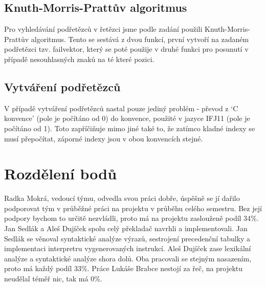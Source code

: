 \documentclass[a4paper,11pt,titlepage]{article}
\begin{document}
\subsection{Knuth-Morris-Prattův algoritmus}

Pro vyhledávání podřetězců v řetězci jsme podle zadání použili Knuth-Morris-Prattův algoritmus. Tento se sestává z dvou funkcí, první vytvoří na zadaném podřetězci tzv. failvektor, který se poté použije v druhé funkci pro posunutí v případě nesouhlasných znaků na té které pozici.

\subsection{Vytváření podřetězců}

V případě vytváření podřetězců nastal pouze jediný problém - převod z `C konvence' (pole je počítáno od 0) do konvence, použité v jazyce IFJ11 (pole je počítáno od 1). Toto zapříčiňuje mimo jiné také to, že zatímco kladné indexy se musí přepočítat, záporné indexy jsou v obou konvencích stejné.

\section{Rozdělení bodů}

Radka Mokrá, vedoucí týmu, odvedla svou práci dobře, úspěšně se jí dařilo podporovat tým v průběžné práci na projektu v průběhu celého semestru. Bez její podpory bychom to určitě nezvládli, proto má na projektu zaslouženě podíl 34\%. Jan Sedlák a Aleš Dujíček spolu celý překladač navrhli a implementovali. Jan Sedlák se věnoval syntaktické analýze výrazů, sestrojení precedenční tabulky a implementaci interpretru vygenerovaných instrukcí. Aleš Dujíček zase lexikální analýze a syntaktické analýze shora dolů. Oba pracovali se stejným nasazením, proto má každý podíl 33\%. Práce Lukáše Brabce nestojí za řeč, na projektu neudělal téměř nic, tak má 0\%.
\end{document}
